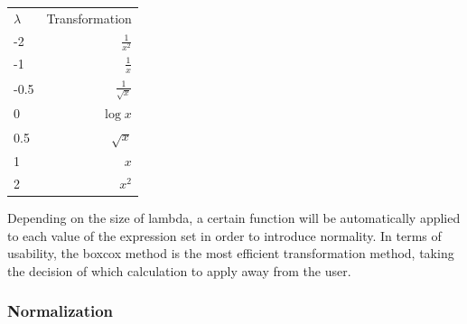 \documentclass[
  11pt,
]{article}
\begin{document}
\begin{center}
\begin{tabular}{l r}
$\lambda$ & Transformation \\
-2 & $\frac{1}{x^2}$ \\
-1 & $\frac{1}{x}$ \\
-0.5 & $\frac{1}{\sqrt{x}}$ \\
0 & $\log{x}$ \\
0.5 & $\sqrt{x}$ \\
1 & $x$ \\
2 & $x^2$
\end{tabular}
\end{center}

Depending on the size of lambda, a certain function will be automatically applied to each value of the expression set in order to introduce normality. In terms of usability, the boxcox method is the most efficient transformation method, taking the decision of which calculation to apply away from the user.

\hypertarget{normalization}{%
\subsubsection{Normalization}\label{normalization}}
\end{document}
